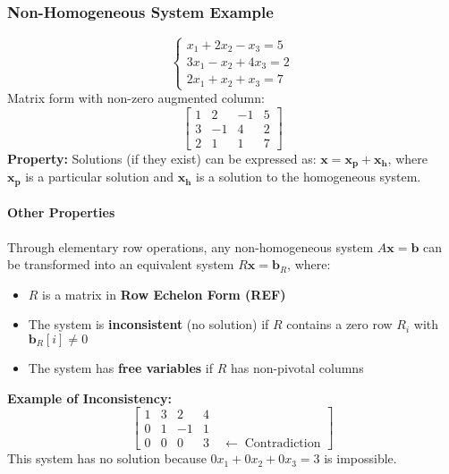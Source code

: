 \documentclass{article}
\begin{document}
\subsubsection*{Non-Homogeneous System Example}
\begin{equation*}
\begin{cases}
    x_1 + 2x_2 - x_3 = 5 \\
    3x_1 - x_2 + 4x_3 = 2 \\
    2x_1 + x_2 + x_3 = 7
\end{cases}
\end{equation*}
Matrix form with non-zero augmented column:
\begin{equation*}
\left[\begin{array}{ccc|c}
1 & 2 & -1 & 5 \\
3 & -1 & 4 & 2 \\
2 & 1 & 1 & 7
\end{array}\right]
\end{equation*}
\textbf{Property:} Solutions (if they exist) can be expressed as:
\( \mathbf{x} = \mathbf{x_p} + \mathbf{x_h} \), where \\
\( \mathbf{x_p} \) is a particular solution and \( \mathbf{x_h} \) is a solution to the homogeneous system.

\paragraph{Other Properties} \label{sec:properties}
Through elementary row operations, any non-homogeneous system \( A\mathbf{x} = \mathbf{b} \) can be transformed into an equivalent system \( R\mathbf{x} = \mathbf{b}_R \), where:
\begin{itemize}
    \item \( R \) is a matrix in \textbf{Row Echelon Form (REF)}
    \item The system is \textbf{inconsistent} (no solution) if \( R \) contains a zero row \( R_i \) with \( \mathbf{b}_R[i] \neq 0 \)
    \item The system has \textbf{free variables} if \( R \) has non-pivotal columns
\end{itemize}

\textbf{Example of Inconsistency:}
\begin{equation*}
\left[\begin{array}{ccc|c}
1 & 3 & 2 & 4 \\
0 & 1 & -1 & 1 \\
0 & 0 & 0 & 3 \quad \leftarrow\; \text{Contradiction}
\end{array}\right]
\end{equation*}
This system has no solution because \( 0x_1 + 0x_2 + 0x_3 = 3 \) is impossible.
\end{document}
